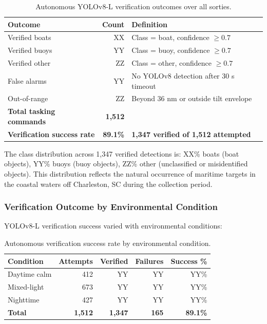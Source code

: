 \documentclass[twocolumn, 10pt]{article}
\begin{document}
\begin{table}[t]
\caption{Autonomous YOLOv8-L verification outcomes over all sorties.}
\label{tab:verification_autonomous}
\centering
\small
\begin{tabular}{@{}lrp{4cm}@{}}
\toprule
Outcome & Count & Definition \\
\midrule
Verified boats & XX & Class = boat, confidence $\geq 0.7$ \\
\midrule
Verified buoys & YY & Class = buoy, confidence $\geq 0.7$ \\
\midrule
Verified other & ZZ & Class = other, confidence $\geq 0.7$ \\
\midrule
False alarms & YY & No YOLOv8 detection after 30 s timeout \\
\midrule
Out-of-range & ZZ & Beyond 36 nm or outside tilt envelope \\
\midrule
\textbf{Total tasking commands} & \textbf{1,512} & \\
\midrule
\textbf{Verification success rate} & \textbf{89.1\%} & \textbf{1,347 verified of 1,512 attempted} \\
\bottomrule
\end{tabular}
\end{table}

The class distribution across 1,347 verified detections is: XX\% boats (boat objects), YY\% buoys (buoy objects), ZZ\% other (unclassified or misidentified objects). This distribution reflects the natural occurrence of maritime targets in the coastal waters off Charleston, SC during the collection period.

\subsubsection{Verification Outcome by Environmental Condition}

YOLOv8-L verification success varied with environmental conditions:

\begin{table}[t]
\caption{Autonomous verification success rate by environmental condition.}
\label{tab:verification_by_condition}
\centering
\small
\begin{tabular}{@{}lrrrr@{}}
\toprule
Condition & Attempts & Verified & Failures & Success \% \\
\midrule
Daytime calm & 412 & YY & YY & YY\% \\
Mixed-light & 673 & YY & YY & YY\% \\
Nighttime & 427 & YY & YY & YY\% \\
\midrule
\textbf{Total} & \textbf{1,512} & \textbf{1,347} & \textbf{165} & \textbf{89.1\%} \\
\bottomrule
\end{tabular}
\end{table}
\end{document}
